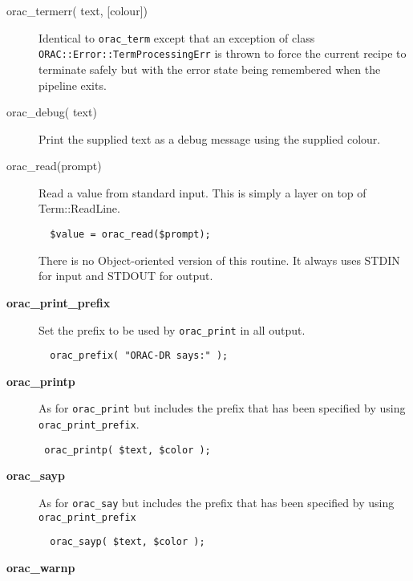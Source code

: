 \begin{description}
\item[{orac\_termerr( text, [colour])}] \mbox{}

Identical to \texttt{orac\_term} except that an exception of class
\texttt{ORAC::Error::TermProcessingErr} is thrown to force the current recipe
to terminate safely but with the error state being remembered when
the pipeline exits.


\item[{orac\_debug( text)}] \mbox{}

Print the supplied text as a debug message using the supplied
colour.


\item[{orac\_read(prompt)}] \mbox{}

Read a value from standard input. This is simply a layer
on top of Term::ReadLine.

\begin{verbatim}
  $value = orac_read($prompt);
\end{verbatim}


There is no Object-oriented version of this routine. It always
uses STDIN for input and STDOUT for output.


\item[{\textbf{orac\_print\_prefix}}] \mbox{}

Set the prefix to be used by \texttt{orac\_print} in all output.

\begin{verbatim}
  orac_prefix( "ORAC-DR says:" );
\end{verbatim}

\item[{\textbf{orac\_printp}}] \mbox{}

As for \texttt{orac\_print} but includes the prefix that has been specified
by using \texttt{orac\_print\_prefix}.

\begin{verbatim}
 orac_printp( $text, $color );
\end{verbatim}

\item[{\textbf{orac\_sayp}}] \mbox{}

As for \texttt{orac\_say} but includes the prefix that has been specified by using \texttt{orac\_print\_prefix}

\begin{verbatim}
  orac_sayp( $text, $color );
\end{verbatim}

\item[{\textbf{orac\_warnp}}] \mbox{}


\end{description}
